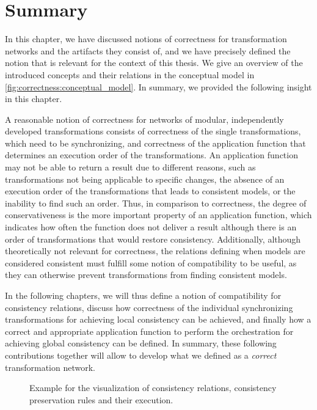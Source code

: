 \section{Summary}
\label{chap:correctness:summary}

In this chapter, we have discussed notions of correctness for transformation networks and the artifacts they consist of, and we have precisely defined the notion that is relevant for the context of this thesis.
We give an overview of the introduced concepts and their relations in the conceptual model in \autoref{fig:correctness:conceptual_model}.
In summary, we provided the following insight in this chapter.

\begin{insight}
    A reasonable notion of correctness for networks of modular, independently developed transformations consists of correctness of the single transformations, which need to be synchronizing, and correctness of the application function that determines an execution order of the transformations.
    An application function may not be able to return a result due to different reasons, such as transformations not being applicable to specific changes, the absence of an execution order of the transformations that leads to consistent models, or the inability to find such an order.
    Thus, in comparison to correctness, the degree of conservativeness is the more important property of an application function, which indicates how often the function does not deliver a result although there is an order of transformations that would restore consistency.
    Additionally, although theoretically not relevant for correctness, the relations defining when models are considered consistent must fulfill some notion of compatibility to be useful, as they can otherwise prevent transformations from finding consistent models.
\end{insight}

In the following chapters, we will thus define a notion of compatibility for consistency relations, discuss how correctness of the individual synchronizing transformations for achieving local consistency can be achieved, and finally how a correct and appropriate application function to perform the orchestration for achieving global consistency can be defined.
In summary, these following contributions together will allow to develop what we defined as a \emph{correct} transformation network.

\begin{figure}
    \centering
    
    \caption[Example for concept visualizations]{Example for the visualization of consistency relations, consistency preservation rules and their execution.}
    \label{fig:correctness:visualization_example}
\end{figure}

